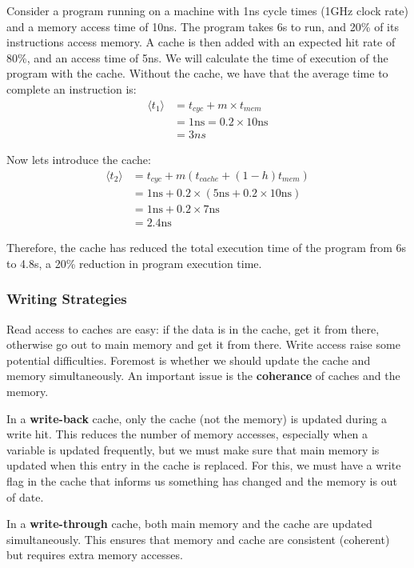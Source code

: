 \documentclass{article}
\begin{document}
	\par Consider a program running on a machine with 1ns cycle times (1GHz clock rate) and a memory access time of 10ns. The program takes 6s to run, and 20\% of its instructions access memory. A cache is then added with an expected hit rate of 80\%, and an access time of 5ns. We will calculate the time of execution of the program with the cache. Without the cache, we have that the average time to complete an instruction is:
	\begin{align*}
	\langle t_{1} \rangle &= t_{cyc} + m \times t_{mem} \\
	&= 1\text{ns} = 0.2 \times 10\text{ns} \\
	&= 3ns
	\end{align*}
	
	Now lets introduce the cache:
	\begin{align*}
	\langle t_{2} \rangle &= t_{cyc} + m(t_{cache} + (1 - h)t_{mem}) \\
	&= 1\text{ns} + 0.2 \times (5\text{ns} + 0.2 \times 10\text{ns}) \\
	&= 1\text{ns} + 0.2 \times 7\text{ns} \\
	&= 2.4\text{ns}
	\end{align*}
	
	Therefore, the cache has reduced the total execution time of the program from 6s to 4.8s, a 20\% reduction in program execution time.
	
	\subsubsection{Writing Strategies}
	Read access to caches are easy: if the data is in the cache, get it from there, otherwise go out to main memory and get it from there. Write access raise some potential difficulties. Foremost is whether we should update the cache and memory simultaneously. An important issue is the \textbf{coherance} of caches and the memory.
	\par 
	In a \textbf{write-back} cache, only the cache (not the memory) is updated during a write hit. This reduces the number of memory accesses, especially when a variable is updated frequently, but we must make sure that main memory is updated when this entry in the cache is replaced. For this, we must have a write flag in the cache that informs us something has changed and the memory is out of date.
	
	\par 
	In a \textbf{write-through} cache, both main memory and the cache are updated simultaneously. This ensures that memory and cache are consistent (coherent) but requires extra memory accesses.
	
\end{document}
